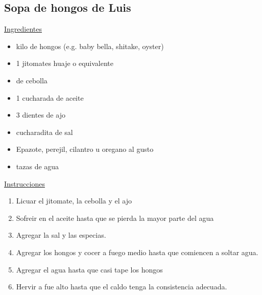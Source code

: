 \subsection{Sopa de hongos de Luis}
\underline{Ingredientes}
\begin{itemize}
\item {} kilo de hongos (e.g. baby bella, shitake,  oyster)
\item 1 jitomates huaje o equivalente
\item {} de cebolla
\item 1 cucharada de aceite
\item 3 dientes de ajo
\item {} cucharadita de sal
\item Epazote, perejil, cilantro u oregano al gusto
\item {} tazas de agua
\end{itemize}

\underline{Instrucciones}
\begin{enumerate}
\item Licuar el jitomate, la cebolla y el ajo
\item Sofreir en el aceite hasta que se pierda la mayor parte del agua
\item Agregar la sal y las especias.
\item Agregar los hongos y cocer a fuego medio hasta que comiencen a soltar agua.
\item Agregar el agua hasta que casi tape los hongos
\item Hervir a fue alto hasta que el caldo tenga la consistencia adecuada.
\end{enumerate}
